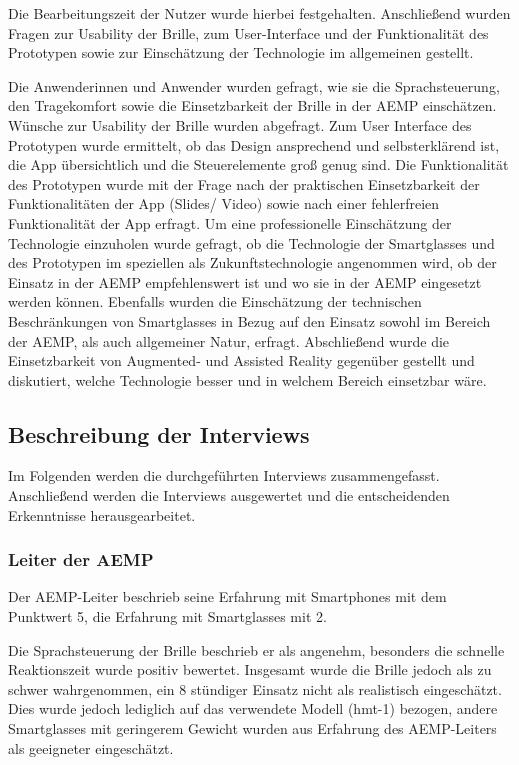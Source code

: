 Die Bearbeitungszeit der Nutzer wurde hierbei festgehalten. Anschließend wurden Fragen zur Usability der Brille, zum User-Interface und der Funktionalität des Prototypen sowie zur Einschätzung der Technologie im allgemeinen gestellt.

Die Anwenderinnen und Anwender wurden gefragt, wie sie die Sprachsteuerung, den Tragekomfort sowie die Einsetzbarkeit der Brille in der AEMP einschätzen. Wünsche zur Usability der Brille wurden abgefragt. Zum User Interface des Prototypen wurde ermittelt, ob das Design ansprechend und selbsterklärend ist, die App übersichtlich und die Steuerelemente groß genug sind. Die Funktionalität des Prototypen wurde mit der Frage nach der praktischen Einsetzbarkeit der Funktionalitäten der App (Slides/ Video) sowie nach einer fehlerfreien Funktionalität der App erfragt. Um eine professionelle Einschätzung der Technologie einzuholen wurde gefragt, ob die Technologie der Smartglasses und des Prototypen im speziellen als Zukunftstechnologie angenommen wird, ob der Einsatz in der AEMP empfehlenswert ist und wo sie in der AEMP eingesetzt werden können. Ebenfalls wurden die Einschätzung der technischen Beschränkungen von Smartglasses in Bezug auf den Einsatz sowohl im Bereich der AEMP, als auch allgemeiner Natur, erfragt. Abschließend wurde die Einsetzbarkeit von Augmented- und Assisted Reality gegenüber gestellt und diskutiert, welche Technologie besser und in welchem Bereich einsetzbar wäre.
%
%
%
%
%
%
%
\subsection{Beschreibung der Interviews}
\label{sec:Beschreinung_der_Interviews}
Im Folgenden werden die durchgeführten Interviews zusammengefasst. Anschließend werden die Interviews ausgewertet und die entscheidenden Erkenntnisse herausgearbeitet.
%
%
\subsubsection{Leiter der AEMP}
%
Der AEMP-Leiter beschrieb seine Erfahrung mit Smartphones mit dem Punktwert 5, die Erfahrung mit Smartglasses mit 2.

Die Sprachsteuerung der Brille beschrieb er als angenehm, besonders die schnelle Reaktionszeit wurde positiv bewertet. Insgesamt wurde die Brille jedoch als zu schwer wahrgenommen, ein 8 stündiger Einsatz nicht als realistisch eingeschätzt. Dies wurde jedoch lediglich auf das verwendete Modell (hmt-1) bezogen, andere Smartglasses mit geringerem Gewicht wurden aus Erfahrung des AEMP-Leiters als geeigneter eingeschätzt.

